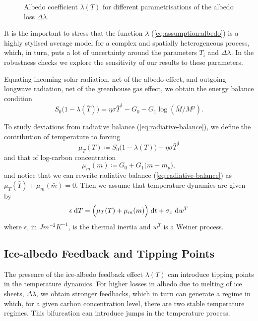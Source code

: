 \documentclass[../../main.tex]{subfiles}
\begin{document}
\begin{figure}[H]
    \centering
    \caption{Albedo coefficient $\lambda(T)$ for different parametrisations of the albedo loss $\Delta \lambda$.}
    \label{fig:albedo_coefficient}
\end{figure}

It is the important to stress that the function $\lambda$ (\ref{eq:assumption:albedo}) is a highly stylised average model for a complex and spatially heterogeneous process, which, in turn, puts a lot of uncertainty around the parameters $T_i$ and $\Delta \lambda$. In the robustness checks we explore the sensitivity of our results to these parameters.

Equating incoming solar radiation, net of the albedo effect, and outgoing longwave radiation, net of the greenhouse gas effect, we obtain the energy balance condition \begin{equation} \label{eq:radiative-balance}
    S_0 \big(1 - \lambda(\bar{T})\big) = \eta \sigma \bar{T}^4 - G_0 - G_1 \log(\bar{M} / M^{\mathrm{p}}).
\end{equation}

To study deviations from radiative balance (\ref{eq:radiative-balance}), we define the contribution of temperature to forcing \begin{equation} \label{eq:forcing:temperature}
    \mu_T(T) \coloneqq S_0 \big(1 - \lambda(T)\big) - \eta \sigma \bar{T}^4
\end{equation} and that of log-carbon concentration \begin{equation} \label{eq:forcing:concentration}
    \mu_m(m) \coloneqq  G_0 + G_1  \big(m - m_p \big),
\end{equation} and notice that we can rewrite radiative balance (\ref{eq:radiative-balance}) as $\mu_T(\bar{T}) + \mu_m(\bar{m}) = 0$. Then we assume that temperature dynamics are given by \begin{equation} \label{eq:dynamics:x}
    \epsilon \; \mathrm{d}T = \Big(\mu_T(T) + \mu_m(m)\Big) \; \mathrm{d}t + \sigma_x \; \mathrm{d}w^T
\end{equation} where $\epsilon$, in $\unit{J} \unit{m}^{-2} \unit{K}^{-1}$, is the thermal inertia and $w^T$ is a Weiner process.

\subsection{Ice-albedo Feedback and Tipping Points}

The presence of the ice-albedo feedback effect $\lambda(T)$ can introduce tipping points in the temperature dynamics. For higher losses in albedo due to melting of ice sheets, $\Delta \lambda$, we obtain stronger feedbacks, which in turn can generate a regime in which, for a given carbon concentration level, there are two stable temperature regimes. This bifurcation can introduce jumps in the temperature process. 
\end{document}
